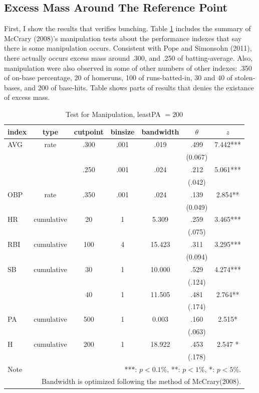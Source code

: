 \documentclass[dvipdfmx, 12pt]{article}
\begin{document}
\subsection{Excess Mass Around The Reference Point}

First, I show the results that verifies bunching. Table \ref{Bunch-True} includes the summary of McCrary (2008)'s manipulation tests about the performance indexes that say there is some manipulation occurs. Consistent with Pope and Simonsohn (2011), there actually occurs excess mass around .300, and .250 of batting-average. Also, manipulation were also observed in some of other numbers of other indexes: .350 of on-base percentage, 20 of homeruns, 100 of runs-batted-in, 30 and 40 of stolen-bases, and 200 of base-hits. Table %
shows parts of results that denies the existance of excess mass.

\begin{table}
  \tiny
  \centering
  \begin{tabular}{lcccccc}\hline
    index & type & cutpoint & binsize & bandwidth & $\theta$ & $z$
    \\ \hline \hline
    AVG & rate & .300 & .001 & .019 &  .499 & 7.442*** \\
    & & & & & (0.067) & \\
    & & .250 & .001 & .024 & .212 & 5.061*** \\
    & & & & & (.042) & \\
    OBP & rate & .350 & .001 & .024 &  .139 & 2.854** \\
    & & & & & (0.049) &  \\
    HR & cumulative & 20 & 1 & 5.309 & .259 & 3.465*** \\
    & & & & & (.075)  & \\
    RBI & cumulative & 100 & 4 & 15.423 & .311 & 3.295*** \\
    & & & & & (0.094) & \\
    SB & cumulative & 30 & 1 & 10.000 & .529 & 4.274*** \\
    & & & & & (.124) & \\
    & & 40 & 1 & 11.505 & .481 & 2.764** \\
    & & & & & (.174) & \\
    PA & cumulative & 500 & 1 & 0.003 & .160 & 2.515* \\
    & & & & &(.063) & \\
    H & cumulative & 200 & 1 & 18.922 & .453 & 2.547 * \\
    & & & & & (.178) & \\ \hline \hline
    Note & \multicolumn{6}{r}{
    ***: $p<0.1\%$, **: $p<1\%$, *: $p<5\%$.
    }\\
    \multicolumn{7}{r}{
    Bandwidth is optimized following the method of McCrary(2008).
    }
  \end{tabular}
  \caption{Test for Manipulation, leastPA $= 200$}
  \label{Bunch-True}
\end{table}
\end{document}
